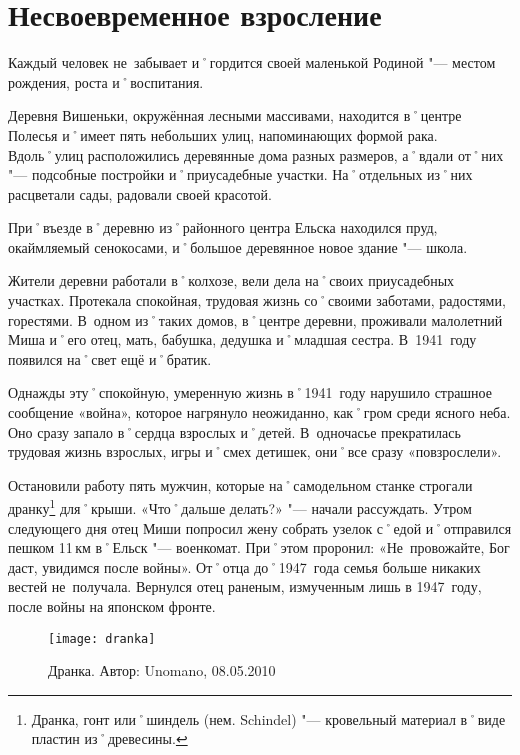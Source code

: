 ﻿\chapter{Несвоевременное взросление}
Каждый человек не~забывает и˚гордится своей маленькой Родиной "--- местом рождения, роста и˚воспитания.

Деревня Вишеньки, окружённая лесными массивами, находится в˚центре Полесья и˚имеет пять небольших улиц, напоминающих формой рака. Вдоль˚улиц расположились деревянные дома разных размеров, а˚вдали от˚них "--- подсобные постройки и˚приусадебные участки. На˚отдельных из˚них расцветали сады, радовали своей красотой.

При˚въезде в˚деревню из˚районного центра Ельска находился пруд, окаймляемый сенокосами, и˚большое деревянное новое здание "--- школа.

Жители деревни работали в˚колхозе, вели дела на˚своих приусадебных участках. Протекала спокойная, трудовая жизнь со˚своими заботами, радостями, горестями. В~одном из˚таких домов, в˚центре деревни, проживали малолетний Миша и˚его отец, мать, бабушка, дедушка и˚младшая сестра. В~1941~году появился на˚свет ещё и˚братик. 

Однажды эту˚спокойную, умеренную жизнь в˚1941~году нарушило страшное сообщение «война», которое нагрянуло неожиданно, как˚гром среди ясного неба. Оно сразу запало в˚сердца взрослых и˚детей. В~одночасье прекратилась трудовая жизнь взрослых, игры и˚смех детишек, они˚все сразу «повзрослели». 

\enlargethispage{-\baselineskip}	%
\pagebreak							%

Остановили работу пять мужчин, которые на˚самодельном станке строгали дранку\footnote{Дранка, гонт или˚шиндель (нем. Schindel) "--- кровельный материал в˚виде пластин из˚древесины.} для˚крыши. «Что˚дальше делать?» "--- начали рассуждать. Утром следующего дня отец Миши попросил жену собрать узелок с˚едой и˚отправился пешком 11\,км в˚Ельск "--- военкомат. При˚этом проронил: «Не~провожайте, Бог даст, увидимся после войны». От˚отца до˚1947~года семья больше никаких вестей не~получала. Вернулся отец раненым, измученным лишь в 1947~году, после войны на японском фронте. 

\begin{wrapfigure}{O}{.4\textwidth}
\centering
\texttt{[image: dranka]}
\caption{Дранка. Автор: \foreignlanguage{english}{Unomano}, 08.05.2010}
\label{fig:dranka}
\end{wrapfigure}

